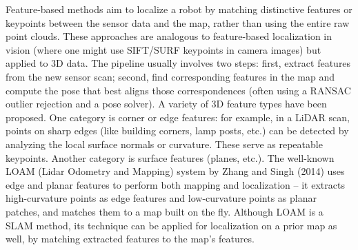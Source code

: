 Feature-based methods aim to localize a robot by matching distinctive features or keypoints between the sensor data and the map, rather than using the entire raw point clouds. These approaches are analogous to feature-based localization in vision (where one might use SIFT/SURF keypoints in camera images) but applied to 3D data. The pipeline usually involves two steps: first, extract features from the new sensor scan; second, find corresponding features in the map and compute the pose that best aligns those correspondences (often using a RANSAC outlier rejection and a pose solver). A variety of 3D feature types have been proposed. One category is corner or edge features: for example, in a LiDAR scan, points on sharp edges (like building corners, lamp posts, etc.) can be detected by analyzing the local surface normals or curvature. These serve as repeatable keypoints. Another category is surface features (planes, etc.). The well-known LOAM (Lidar Odometry and Mapping) system by Zhang and Singh (2014) uses edge and planar features to perform both mapping and localization – it extracts high-curvature points as edge features and low-curvature points as planar patches, and matches them to a map built on the fly. Although LOAM is a SLAM method, its technique can be applied for localization on a prior map as well, by matching extracted features to the map’s features.

